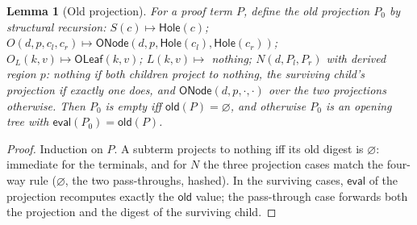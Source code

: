 \documentclass[11pt]{article}
\newtheorem{lemma}{Lemma}
\begin{document}
\begin{lemma}[Old projection]
\label{lem:proj}
For a proof term $P$, define the \emph{old projection} $P_0$ by structural recursion: $S(c) \mapsto \mathsf{Hole}(c)$; $O(d,p,c_l,c_r) \mapsto \mathsf{ONode}(d,p,\mathsf{Hole}(c_l),\mathsf{Hole}(c_r))$; $O_L(k,v) \mapsto \mathsf{OLeaf}(k,v)$; $L(k,v) \mapsto$ nothing; $N(d,P_l,P_r)$ with derived region $p$: nothing if both children project to nothing, the surviving child's projection if exactly one does, and $\mathsf{ONode}(d,p,\cdot,\cdot)$ over the two projections otherwise. Then $P_0$ is empty iff $\mathsf{old}(P) = \varnothing$, and otherwise $P_0$ is an opening tree with $\mathsf{eval}(P_0) = \mathsf{old}(P)$.
\end{lemma}
\begin{proof}
Induction on $P$. A subterm projects to nothing iff its old digest is $\varnothing$: immediate for the terminals, and for $N$ the three projection cases match the four-way rule ($\varnothing$, the two pass-throughs, hashed). In the surviving cases, $\mathsf{eval}$ of the projection recomputes exactly the $\mathsf{old}$ value; the pass-through case forwards both the projection and the digest of the surviving child.
\end{proof}
\end{document}
